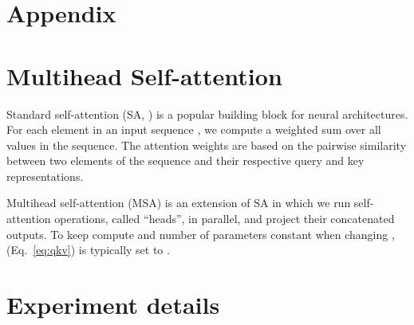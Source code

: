 \appendix
\section*{Appendix}

\section{Multihead Self-attention}
\label{sec:self_attention}
Standard  self-attention (SA, \citet{vaswani2017}) is a popular building block for neural architectures. For each element in an input sequence , we compute a weighted sum over all values  in the sequence. The attention weights  are based on the pairwise similarity between two elements of the sequence and their respective query  and key  representations.


Multihead self-attention (MSA) is an extension of SA in which we run  self-attention operations, called ``heads'', in parallel, and project their concatenated outputs. To keep compute and number of parameters constant when changing ,  (Eq.~\ref{eq:qkv}) is typically set to .


\section{Experiment details}

